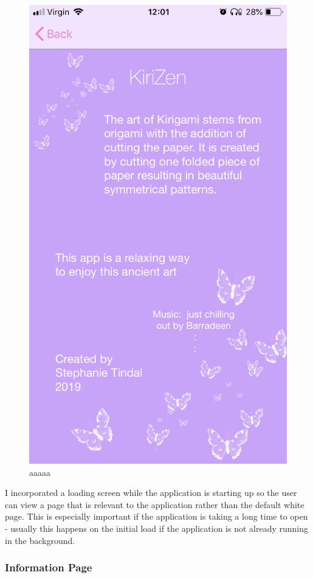 \documentclass[11pt]{article}
\begin{document}
\begin{figure}[!ht]
\begin{minipage}{0.45\textwidth}
                            \includegraphics[width=0.7\linewidth]{KiriZen/info.png}
                            \caption{aaaaa}
                            \label{fig:kiriZen-info}
                        \end{minipage}
                    \end{figure}
            
                I incorporated a loading screen while the application is starting up so the user can view a page that is relevant to the application rather than the default white page. This is especially important if the application is taking a long time to open - usually this happens on the initial load if the application is not already running in the background.
                

                
                 \subsubsection{Information Page}
                
\end{document}

